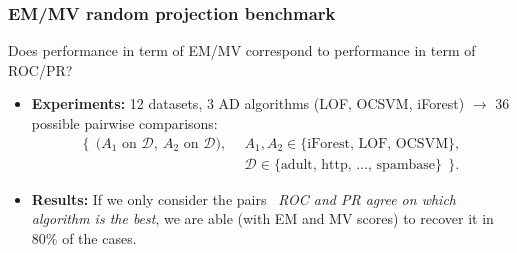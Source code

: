 \documentclass[9pt]{beamer}
\newcommand{\st}{\text{\emph{s.t.}}{}}
\begin{document}








\begin{frame}
\frametitle{EM/MV random projection benchmark}
\begin{block}{Does performance in term of EM/MV correspond to performance in term of ROC/PR?}

\begin{itemize}
\item \textbf{Experiments:}
{\small
12 datasets, 3 AD algorithms (LOF, OCSVM, iForest)
$\to$ 36 possible pairwise comparisons:
\begin{align*}
\bigg\{~~\Big(A_1 \text{~on~} \mathcal{D},~ A_2 \text{~on~} \mathcal{D}\Big),~~ & A_1, A_2 \in \{\text{iForest, LOF, OCSVM}\}, \\
& \mathcal{D} \in \{\text{adult, http, \ldots, spambase}\} ~~\bigg\}.
\end{align*}
}


\item \textbf{Results:}
{ \small
If we only consider the pairs \st~\emph{ROC and PR agree on which algorithm is the best}, we are able (with EM and MV scores) to recover it in $80\%$ of the cases.
}
\end{itemize}


\end{block}
\end{frame}
\end{document}
